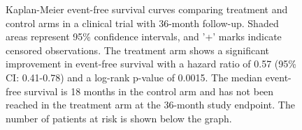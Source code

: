 \begin{figure}[htbp]
    \caption{Kaplan-Meier event-free survival curves comparing treatment and control arms in a clinical trial with 36-month follow-up. Shaded areas represent 95\% confidence intervals, and '+' marks indicate censored observations. The treatment arm shows a significant improvement in event-free survival with a hazard ratio of 0.57 (95\% CI: 0.41-0.78) and a log-rank p-value of 0.0015. The median event-free survival is 18 months in the control arm and has not been reached in the treatment arm at the 36-month study endpoint. The number of patients at risk is shown below the graph.}
    \label{fig:km-clinical}
\end{figure}
